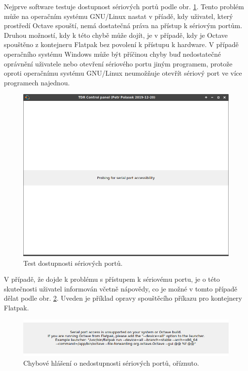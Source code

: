 Nejprve software testuje dostupnost sériových portů podle obr. \ref{serial_probe}. Tento problém může na operačním systému GNU/Linux nastat v příadě, kdy uživatel, který prostředí Octave spouští, nemá dostatečná práva na přístup k sériovým portům. Druhou možností, kdy k této chybě může dojít, je v případě, kdy je Octave spouštěno z kontejneru Flatpak bez povolení k přístupu k hardware. V případě operačního systému Windows může být příčinou chyby buď nedostatečné oprávnění uživatele nebo otevření sériového portu jiným programem, protože oproti operačnímu systému GNU/Linux neumožňuje otevřít sériový port ve více programech najednou.
\begin{figure}[H]
\includegraphics[width=\textwidth,keepaspectratio]{images/gui/serial_probe.png}\caption{Test dostupnosti sériových portů.}\label{serial_probe}
\end{figure}	

V případě, že dojde k problému s přístupem k sériovému portu, je o této skutečnosti uživatel informován včetně nápovědy, co je možné v tomto případě dělat podle obr. \ref{serial_port_unsupported}. Uveden je příklad opravy spouštěcího příkazu pro kontejnery Flatpak.
\begin{figure}[H]
\includegraphics[width=\textwidth,keepaspectratio]{images/gui/serial_port_unsupported_cut.png}\caption{Chybové hlášení o nedostupnosti sériových portů, oříznuto.}\label{serial_port_unsupported}
\end{figure}	

